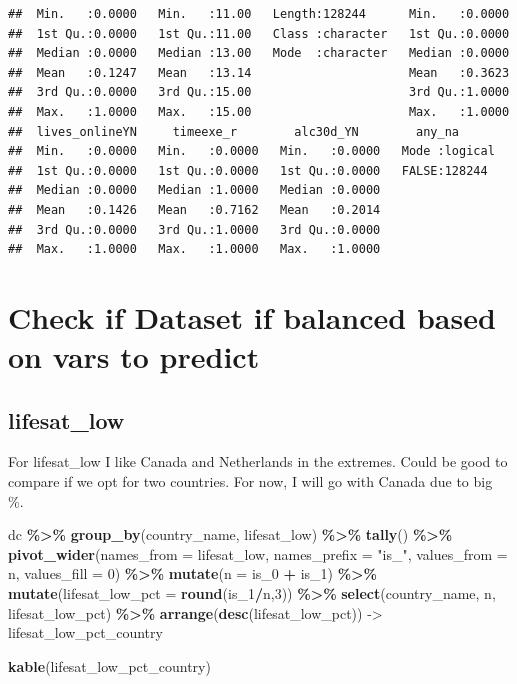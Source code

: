 \documentclass[
]{article}
\newenvironment{Shaded}{\begin{snugshade}}{\end{snugshade}}
\newcommand{\AttributeTok}[1]{\textcolor[rgb]{0.13,0.29,0.53}{#1}}
\newcommand{\DecValTok}[1]{\textcolor[rgb]{0.00,0.00,0.81}{#1}}
\newcommand{\FunctionTok}[1]{\textcolor[rgb]{0.13,0.29,0.53}{\textbf{#1}}}
\newcommand{\NormalTok}[1]{#1}
\newcommand{\OtherTok}[1]{\textcolor[rgb]{0.56,0.35,0.01}{#1}}
\newcommand{\SpecialCharTok}[1]{\textcolor[rgb]{0.81,0.36,0.00}{\textbf{#1}}}
\newcommand{\StringTok}[1]{\textcolor[rgb]{0.31,0.60,0.02}{#1}}
\begin{document}
\begin{verbatim}
##  Min.   :0.0000   Min.   :11.00   Length:128244      Min.   :0.0000  
##  1st Qu.:0.0000   1st Qu.:11.00   Class :character   1st Qu.:0.0000  
##  Median :0.0000   Median :13.00   Mode  :character   Median :0.0000  
##  Mean   :0.1247   Mean   :13.14                      Mean   :0.3623  
##  3rd Qu.:0.0000   3rd Qu.:15.00                      3rd Qu.:1.0000  
##  Max.   :1.0000   Max.   :15.00                      Max.   :1.0000  
##  lives_onlineYN     timeexe_r        alc30d_YN        any_na       
##  Min.   :0.0000   Min.   :0.0000   Min.   :0.0000   Mode :logical  
##  1st Qu.:0.0000   1st Qu.:0.0000   1st Qu.:0.0000   FALSE:128244   
##  Median :0.0000   Median :1.0000   Median :0.0000                  
##  Mean   :0.1426   Mean   :0.7162   Mean   :0.2014                  
##  3rd Qu.:0.0000   3rd Qu.:1.0000   3rd Qu.:0.0000                  
##  Max.   :1.0000   Max.   :1.0000   Max.   :1.0000
\end{verbatim}

\section{Check if Dataset if balanced based on vars to
predict}\label{check-if-dataset-if-balanced-based-on-vars-to-predict}

\subsection{lifesat\_low}\label{lifesat_low}

For lifesat\_low I like Canada and Netherlands in the extremes. Could be
good to compare if we opt for two countries. For now, I will go with
Canada due to big \%.

\begin{Shaded}
\begin{Highlighting}[]
\NormalTok{dc }\SpecialCharTok{\%\textgreater{}\%}
  \FunctionTok{group\_by}\NormalTok{(country\_name, lifesat\_low) }\SpecialCharTok{\%\textgreater{}\%}
  \FunctionTok{tally}\NormalTok{() }\SpecialCharTok{\%\textgreater{}\%}
  \FunctionTok{pivot\_wider}\NormalTok{(}\AttributeTok{names\_from =}\NormalTok{ lifesat\_low,}
              \AttributeTok{names\_prefix =} \StringTok{"is\_"}\NormalTok{,}
              \AttributeTok{values\_from =}\NormalTok{ n,}
              \AttributeTok{values\_fill =} \DecValTok{0}\NormalTok{) }\SpecialCharTok{\%\textgreater{}\%}
  \FunctionTok{mutate}\NormalTok{(}\AttributeTok{n =}\NormalTok{ is\_0 }\SpecialCharTok{+}\NormalTok{ is\_1) }\SpecialCharTok{\%\textgreater{}\%}
  \FunctionTok{mutate}\NormalTok{(}\AttributeTok{lifesat\_low\_pct =} \FunctionTok{round}\NormalTok{(is\_1}\SpecialCharTok{/}\NormalTok{n,}\DecValTok{3}\NormalTok{)) }\SpecialCharTok{\%\textgreater{}\%}
  \FunctionTok{select}\NormalTok{(country\_name, n, lifesat\_low\_pct) }\SpecialCharTok{\%\textgreater{}\%}
  \FunctionTok{arrange}\NormalTok{(}\FunctionTok{desc}\NormalTok{(lifesat\_low\_pct)) }\OtherTok{{-}\textgreater{}}\NormalTok{ lifesat\_low\_pct\_country}

\FunctionTok{kable}\NormalTok{(lifesat\_low\_pct\_country)}
\end{Highlighting}
\end{Shaded}
\end{document}
